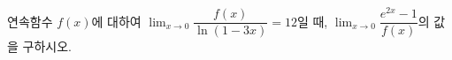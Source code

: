 연속함수 $f(x)$에 대하여 $\displaystyle\lim_{x\to 0}\dfrac{f(x)}{\ln(1-3x)}=12$일 때, $\displaystyle\lim_{x\to 0}\dfrac{e^{2x}-1}{f(x)}$의 값을 구하시오.

